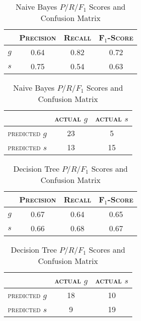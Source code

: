 \begin{table}[ht]
\begin{minipage}[b]{0.45\linewidth}\centering
\begin{tabular}{ c | c  c  c }
	& \textsc{Precision} & \textsc{Recall} & \textsc{F$_1$-Score} \\
	\hline
	\textsc{$g$} 	& 0.64  &    0.82   &   0.72 \\
	\textsc{$s$}	& 0.75  &    0.54   &   0.63
\end{tabular}
\end{minipage}
\hspace{0.5cm}
\begin{minipage}[b]{0.45\linewidth}
\centering
\begin{tabular}{ c | c  c }
	 & \textsc{actual $g$} & \textsc{actual $s$} \\
	\hline
	\textsc{predicted $g$} 	& 23 & 5 \\
	\textsc{predicted $s$}		& 13 & 15
\end{tabular}
\end{minipage}
\caption{Naive Bayes $P/R/F_1$ Scores and Confusion Matrix}
\end{table}

\begin{table}[ht]
\begin{minipage}[b]{0.45\linewidth}\centering
\begin{tabular}{ c | c  c  c }
	& \textsc{Precision} & \textsc{Recall} & \textsc{F$_1$-Score} \\
	\hline
	\textsc{$g$} 	& 0.67   &   0.64   &   0.65 \\
	\textsc{$s$}	& 0.66   &   0.68   &   0.67
\end{tabular}
\end{minipage}
\hspace{0.5cm}
\begin{minipage}[b]{0.45\linewidth}
\centering
\begin{tabular}{ c | c  c }
	 & \textsc{actual $g$} & \textsc{actual $s$} \\
	\hline
	\textsc{predicted $g$} 	& 18 & 10 \\
	\textsc{predicted $s$}		& 9 & 19
\end{tabular}
\end{minipage}
\caption{Decision Tree $P/R/F_1$ Scores and Confusion Matrix}
\end{table}
\newpage

